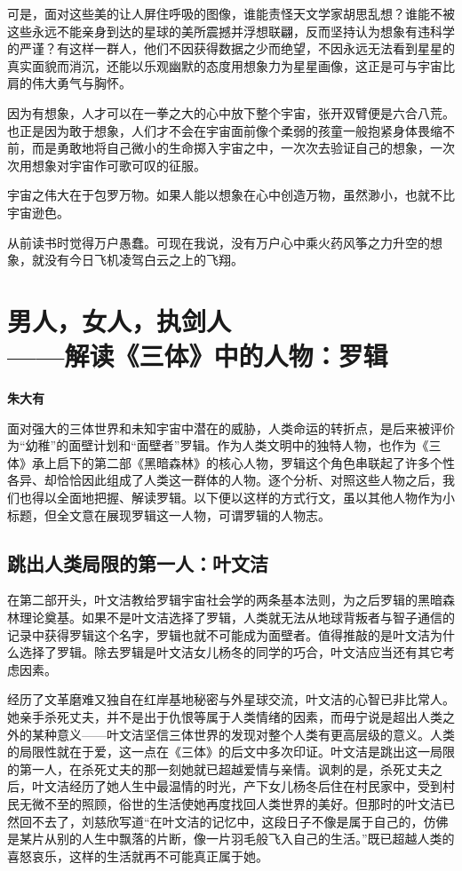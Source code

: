 \documentclass[openany,scheme = chinese, linespread = 1.5]{ctexbook}
\newcommand \name[1]{\begin{center} \kaishu \Large \bfseries #1 \end{center}}
\begin{document}
可是，面对这些美的让人屏住呼吸的图像，谁能责怪天文学家胡思乱想？谁能不被这些永远不能亲身到达的星球的美所震撼并浮想联翩，反而坚持认为想象有违科学的严谨？有这样一群人，他们不因获得数据之少而绝望，不因永远无法看到星星的真实面貌而消沉，还能以乐观幽默的态度用想象力为星星画像，这正是可与宇宙比肩的伟大勇气与胸怀。

因为有想象，人才可以在一拳之大的心中放下整个宇宙，张开双臂便是六合八荒。也正是因为敢于想象，人们才不会在宇宙面前像个柔弱的孩童一般抱紧身体畏缩不前，而是勇敢地将自己微小的生命掷入宇宙之中，一次次去验证自己的想象，一次次用想象对宇宙作可歌可叹的征服。

宇宙之伟大在于包罗万物。如果人能以想象在心中创造万物，虽然渺小，也就不比宇宙逊色。

从前读书时觉得万户愚蠢。可现在我说，没有万户心中乘火药风筝之力升空的想象，就没有今日飞机凌驾白云之上的飞翔。

\newpage
\section{男人，女人，执剑人\\——解读《三体》中的人物：罗辑}
\name{朱大有}

面对强大的三体世界和未知宇宙中潜在的威胁，人类命运的转折点，是后来被评价为“幼稚”的面壁计划和“面壁者”罗辑。作为人类文明中的独特人物，也作为《三体》承上启下的第二部《黑暗森林》的核心人物，罗辑这个角色串联起了许多个性各异、却恰恰因此组成了人类这一群体的人物。逐个分析、对照这些人物之后，我们也得以全面地把握、解读罗辑。以下便以这样的方式行文，虽以其他人物作为小标题，但全文意在展现罗辑这一人物，可谓罗辑的人物志。

\subsection*{跳出人类局限的第一人：叶文洁}

在第二部开头，叶文洁教给罗辑宇宙社会学的两条基本法则，为之后罗辑的黑暗森林理论奠基。如果不是叶文洁选择了罗辑，人类就无法从地球背叛者与智子通信的记录中获得罗辑这个名字，罗辑也就不可能成为面壁者。值得推敲的是叶文洁为什么选择了罗辑。除去罗辑是叶文洁女儿杨冬的同学的巧合，叶文洁应当还有其它考虑因素。

经历了文革磨难又独自在红岸基地秘密与外星球交流，叶文洁的心智已非比常人。她亲手杀死丈夫，并不是出于仇恨等属于人类情绪的因素，而毋宁说是超出人类之外的某种意义——叶文洁坚信三体世界的发现对整个人类有更高层级的意义。人类的局限性就在于爱，这一点在《三体》的后文中多次印证。叶文洁是跳出这一局限的第一人，在杀死丈夫的那一刻她就已超越爱情与亲情。讽刺的是，杀死丈夫之后，叶文洁经历了她人生中最温情的时光，产下女儿杨冬后住在村民家中，受到村民无微不至的照顾，俗世的生活使她再度找回人类世界的美好。但那时的叶文洁已然回不去了，刘慈欣写道“在叶文洁的记忆中，这段日子不像是属于自己的，仿佛是某片从别的人生中飘落的片断，像一片羽毛般飞入自己的生活。”既已超越人类的喜怒哀乐，这样的生活就再不可能真正属于她。
\end{document}
